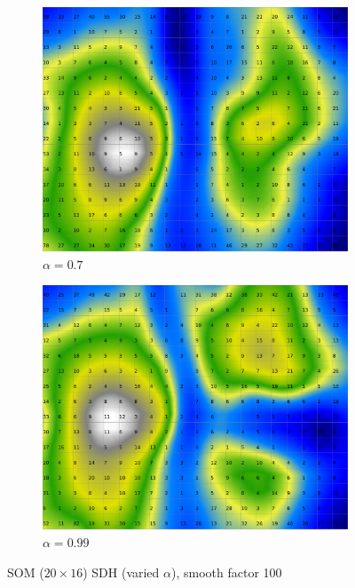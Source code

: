 \documentclass{acm_proc_article-sp}
\begin{document}
\begin{figure}
\begin{subfigure}[b]{0.24\linewidth}
        \label{fig:wine-20x16-smoothed-data-histogram-alpha-0,45-f-100}
    \end{subfigure}
    \begin{subfigure}[b]{0.24\linewidth}
        \includegraphics[width=\linewidth]{img/wine-20x16-smoothed-data-histogram-alpha-0,7-f-100}
        \caption{$\alpha=0.7$}
        \label{fig:wine-20x16-smoothed-data-histogram-alpha-0,7-f-100}
    \end{subfigure}
    \begin{subfigure}[b]{0.24\linewidth}
        \includegraphics[width=\linewidth]{img/wine-20x16-smoothed-data-histogram-alpha-0,99-f-100}
        \caption{$\alpha=0.99$}
        \label{fig:wine-20x16-smoothed-data-histogram-alpha-0,99-f-100}
    \end{subfigure}
    \caption{SOM ($20\times16$) SDH (varied $\alpha$), smooth factor 100}
    \label{fig:wine-20x16-smoothed-data-histogram-alpha-f-100}
\end{figure}
\end{document}
